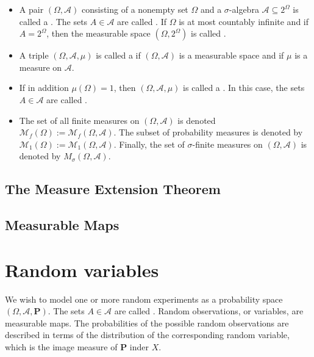 \documentclass[12pt, a4paper, oneside, openright, titlepage]{book}
\begin{document}
\begin{defn}
    \leavevmode
    \begin{itemize}
        \item A pair $(\Omega,\mathcal{A})$ consisting of a nonempty set $\Omega$ and a $\sigma$-algebra $\mathcal{A}\subseteq 2^{\Omega}$ is called a . The sets $A \in \mathcal{A}$ are called . If $\Omega$ is at most countably infinite and if $A = 2^{\Omega}$, then the measurable space $(\Omega,2^{\Omega})$ is called .
        \item A triple $(\Omega,\mathcal{A},\mu)$ is called a  if $(\Omega,\mathcal{A})$ is a measurable space and if $\mu$ is a measure on $\mathcal{A}$.
        \item If in addition $\mu(\Omega) = 1$, then $(\Omega,\mathcal{A},\mu)$ is called a . In this case, the sets $A \in \mathcal{A}$ are called .
        \item The set of all finite measures on $(\Omega,\mathcal{A})$ is denoted $\mathcal{M}_f(\Omega) := \mathcal{M}_f(\Omega,\mathcal{A})$. The subset of probability measures is denoted by $\mathcal{M}_1(\Omega) := \mathcal{M}_1(\Omega, \mathcal{A})$. Finally, the set of $\sigma$-finite measures on $(\Omega,\mathcal{A})$ is denoted by $M_{\sigma}(\Omega,\mathcal{A})$.
    \end{itemize}
\end{defn}


\subsection{The Measure Extension Theorem}

\subsection{Measurable Maps}



\section{Random variables}

We wish to model one or more random experiments as a probability space $(\Omega,\mathcal{A},\mathbf{P})$. The sets $A \in \mathcal{A}$ are called . Random observations, or variables, are measurable maps. The probabilities of the possible random observations are described in terms of the distribution of the corresponding random variable, which is the image measure of $\mathbf{P}$ inder $X$.
\end{document}
